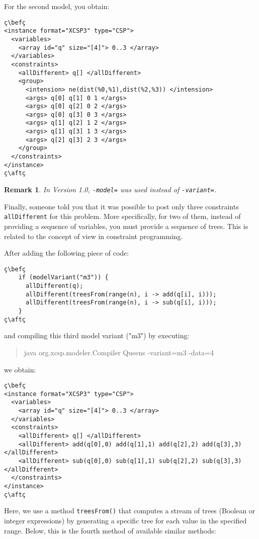 \documentclass[10pt]{article}
\newtheorem{remark}{Remark}
\newcommand{\gb}[1]{{\tt #1}} %
\newcommand{\nn}[1]{{\tt #1}} %
\newenvironment{myvb}{\endgraf\small\verbatim}{\endverbatim}
\def\bef{\rule{10cm}{0.1mm}} %
\def\aft{\rule{10cm}{0.1mm}\medskip}
\begin{document}
For the second model, you obtain:

\begin{lstlisting}
ç\befç
<instance format="XCSP3" type="CSP">
  <variables>
    <array id="q" size="[4]"> 0..3 </array>
  </variables>
  <constraints>
    <allDifferent> q[] </allDifferent>
    <group>
      <intension> ne(dist(%0,%1),dist(%2,%3)) </intension>
      <args> q[0] q[1] 0 1 </args>
      <args> q[0] q[2] 0 2 </args>
      <args> q[0] q[3] 0 3 </args>
      <args> q[1] q[2] 1 2 </args>
      <args> q[1] q[3] 1 3 </args>
      <args> q[2] q[3] 2 3 </args>
    </group>
  </constraints>
</instance>
ç\aftç
\end{lstlisting}

\begin{remark}
  In Version 1.0, \verb!-model=! was used instead of \verb!-variant=!.
\end{remark}

Finally, someone told you that it was possible to post only three constraints \gb{allDifferent} for this problem.
More specifically, for two of them, instead of providing a sequence of variables, you must provide a sequence of trees.
This is related to the concept of view in constraint programming.

After adding the following piece of code:
\begin{lstlisting}
ç\befç
    if (modelVariant("m3")) {
      allDifferent(q);
      allDifferent(treesFrom(range(n), i -> add(q[i], i)));
      allDifferent(treesFrom(range(n), i -> sub(q[i], i)));
    }
ç\aftç
\end{lstlisting}
and compiling this third model variant ("m3") by executing:
\begin{quote}
\begin{myvb}
java org.xcsp.modeler.Compiler Queens -variant=m3 -data=4
\end{myvb}
\end{quote}
we obtain:
\begin{lstlisting}
ç\befç
<instance format="XCSP3" type="CSP">
  <variables>
    <array id="q" size="[4]"> 0..3 </array>
  </variables>
  <constraints>
    <allDifferent> q[] </allDifferent>
    <allDifferent> add(q[0],0) add(q[1],1) add(q[2],2) add(q[3],3) </allDifferent>
    <allDifferent> sub(q[0],0) sub(q[1],1) sub(q[2],2) sub(q[3],3) </allDifferent>
  </constraints>
</instance>
ç\aftç
\end{lstlisting}

Here, we use a method \nn{treesFrom()} that computes a stream of trees (Boolean or integer expressions) by generating a specific tree for each value in the specified range.
Below, this is the fourth method of available similar methods:
\end{document}

